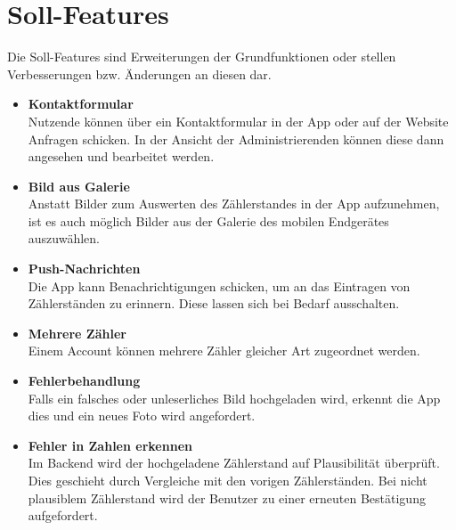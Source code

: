 \section{Soll-Features}
Die Soll-Features sind Erweiterungen der Grundfunktionen oder stellen Verbesserungen bzw. Änderungen an diesen dar.
\begin{itemize}
\item \textbf{Kontaktformular} \hfill \\
	Nutzende können über ein Kontaktformular in der App oder auf der Website Anfragen schicken.
	In der Ansicht der Administrierenden können diese dann angesehen und bearbeitet werden. 
\item \textbf{Bild aus Galerie} \hfill \\
	Anstatt Bilder zum Auswerten des Zählerstandes in der App aufzunehmen, ist es auch möglich Bilder aus der Galerie des mobilen Endgerätes auszuwählen.
\item \textbf{Push-Nachrichten} \hfill \\
	Die App kann Benachrichtigungen schicken, um an das Eintragen von Zählerständen zu erinnern.
	Diese lassen sich bei Bedarf ausschalten.
\item \textbf{Mehrere Zähler}\hfill \\
	Einem Account können mehrere Zähler gleicher Art zugeordnet werden.
\item \textbf{Fehlerbehandlung} \hfill \\
	Falls ein falsches oder unleserliches Bild hochgeladen wird, erkennt die App dies und ein neues Foto wird angefordert.
\item \textbf{Fehler in Zahlen erkennen} \hfill \\
	Im Backend wird der hochgeladene Zählerstand auf Plausibilität überprüft. Dies geschieht durch Vergleiche mit den vorigen Zählerständen. 
	Bei nicht plausiblem Zählerstand wird der Benutzer zu einer erneuten Bestätigung aufgefordert. 
\end{itemize}

